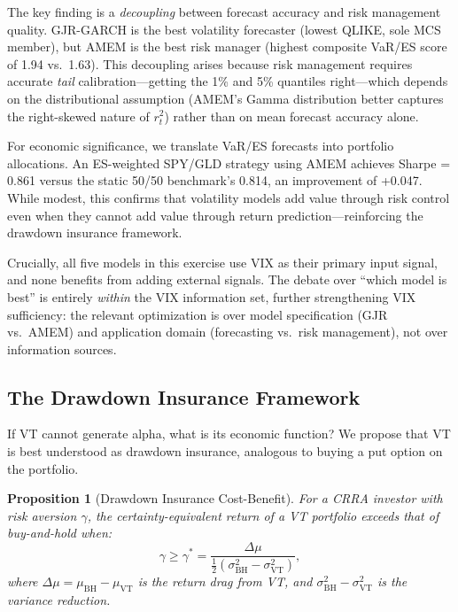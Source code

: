 \documentclass[12pt,a4paper]{article}
\newtheorem{proposition}{Proposition}
\begin{document}
The key finding is a \emph{decoupling} between forecast accuracy and risk management quality. GJR-GARCH is the best volatility forecaster (lowest QLIKE, sole MCS member), but AMEM is the best risk manager (highest composite VaR/ES score of 1.94 vs.\ 1.63). This decoupling arises because risk management requires accurate \emph{tail} calibration---getting the 1\% and 5\% quantiles right---which depends on the distributional assumption (AMEM's Gamma distribution better captures the right-skewed nature of $r_t^2$) rather than on mean forecast accuracy alone.

For economic significance, we translate VaR/ES forecasts into portfolio allocations. An ES-weighted SPY/GLD strategy using AMEM achieves Sharpe = 0.861 versus the static 50/50 benchmark's 0.814, an improvement of +0.047. While modest, this confirms that volatility models add value through risk control even when they cannot add value through return prediction---reinforcing the drawdown insurance framework.

Crucially, all five models in this exercise use VIX as their primary input signal, and none benefits from adding external signals. The debate over ``which model is best'' is entirely \emph{within} the VIX information set, further strengthening VIX sufficiency: the relevant optimization is over model specification (GJR vs.\ AMEM) and application domain (forecasting vs.\ risk management), not over information sources.

\subsection{The Drawdown Insurance Framework}

If VT cannot generate alpha, what is its economic function? We propose that VT is best understood as drawdown insurance, analogous to buying a put option on the portfolio.

\begin{proposition}[Drawdown Insurance Cost-Benefit]
\label{prop:insurance}
For a CRRA investor with risk aversion $\gamma$, the certainty-equivalent return of a VT portfolio exceeds that of buy-and-hold when:
\begin{equation}
\gamma \geq \gamma^* = \frac{\Delta \mu}{\frac{1}{2}(\sigma_{\text{BH}}^2 - \sigma_{\text{VT}}^2)},
\label{eq:gamma_star}
\end{equation}
where $\Delta \mu = \mu_{\text{BH}} - \mu_{\text{VT}}$ is the return drag from VT, and $\sigma_{\text{BH}}^2 - \sigma_{\text{VT}}^2$ is the variance reduction.
\end{proposition}
\end{document}
